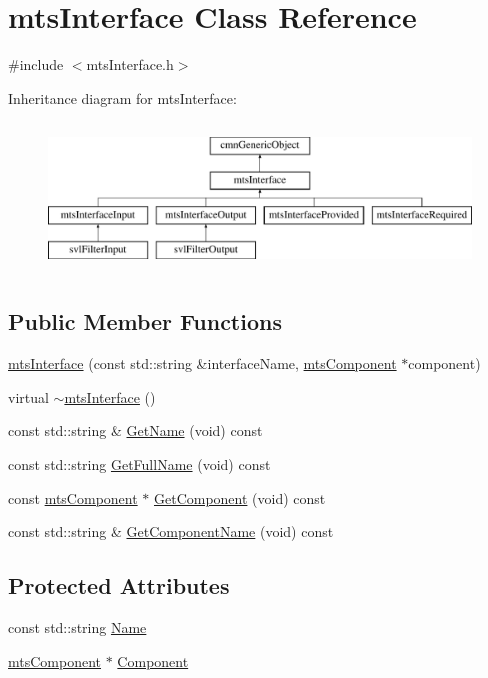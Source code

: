 \hypertarget{classmts_interface}{\section{mts\-Interface Class Reference}
\label{classmts_interface}
}


{\ttfamily \#include $<$mts\-Interface.\-h$>$}

Inheritance diagram for mts\-Interface\-:\begin{figure}[H]
\begin{center}
\leavevmode
\includegraphics[height=4.000000cm]{d2/d17/classmts_interface}
\end{center}
\end{figure}
\subsection*{Public Member Functions}
\begin{DoxyCompactItemize}
\item 
\hyperlink{classmts_interface_a81550185a767638618b32090dcd44878}{mts\-Interface} (const std\-::string \&interface\-Name, \hyperlink{classmts_component}{mts\-Component} $\ast$component)
\item 
virtual \hyperlink{classmts_interface_a6a1752d31236ceb008ca40f4ee82c773}{$\sim$mts\-Interface} ()
\item 
const std\-::string \& \hyperlink{classmts_interface_ac56c1713f186cdd01f78e6cd62c678ff}{Get\-Name} (void) const 
\item 
const std\-::string \hyperlink{classmts_interface_a4bd6689c8baacc8dc5e635ac09afca31}{Get\-Full\-Name} (void) const 
\item 
const \hyperlink{classmts_component}{mts\-Component} $\ast$ \hyperlink{classmts_interface_a08628db382b7d92145c55d6f0397b4c8}{Get\-Component} (void) const 
\item 
const std\-::string \& \hyperlink{classmts_interface_a927f3c64a832e9fb05956b27863f2531}{Get\-Component\-Name} (void) const 
\end{DoxyCompactItemize}
\subsection*{Protected Attributes}
\begin{DoxyCompactItemize}
\item 
const std\-::string \hyperlink{classmts_interface_a2c42a04708dfe68848d34bff4a5ee80b}{Name}
\item 
\hyperlink{classmts_component}{mts\-Component} $\ast$ \hyperlink{classmts_interface_a7529d1beb91c4e4786d4c7e377bb91ae}{Component}
\end{DoxyCompactItemize}


